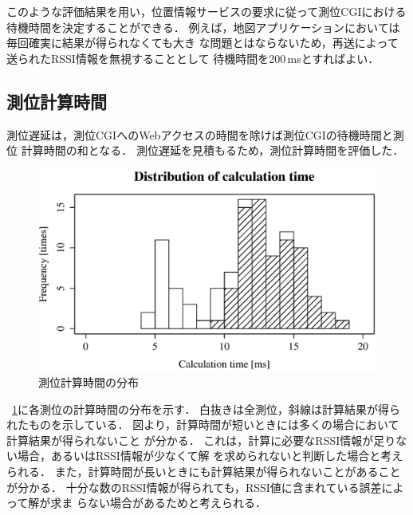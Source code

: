\documentclass[technicalreport]{ieicej}
\begin{document}
このような評価結果を用い，位置情報サービスの要求に従って測位CGIにおける
待機時間を決定することができる．
例えば，地図アプリケーションにおいては毎回確実に結果が得られなくても大き
な問題とはならないため，再送によって送られたRSSI情報を無視することとして
待機時間を200\,msとすればよい．

\subsection{測位計算時間}

測位遅延は，測位CGIへのWebアクセスの時間を除けば測位CGIの待機時間と測位
計算時間の和となる．
測位遅延を見積もるため，測位計算時間を評価した．

\begin{figure}[bt]
 \centering
 \includegraphics[width=\columnwidth]{figure/calc_time.eps}
 \caption{測位計算時間の分布}
 \label{fig:calc_time}
\end{figure}

\figurename~\ref{fig:calc_time}に各測位の計算時間の分布を示す．
白抜きは全測位，斜線は計算結果が得られたものを示している．
図より，計算時間が短いときには多くの場合において計算結果が得られないこと
が分かる．
これは，計算に必要なRSSI情報が足りない場合，あるいはRSSI情報が少なくて解
を求められないと判断した場合と考えられる．
また，計算時間が長いときにも計算結果が得られないことがあることが分かる．
十分な数のRSSI情報が得られても，RSSI値に含まれている誤差によって解が求ま
らない場合があるためと考えられる．
\end{document}
